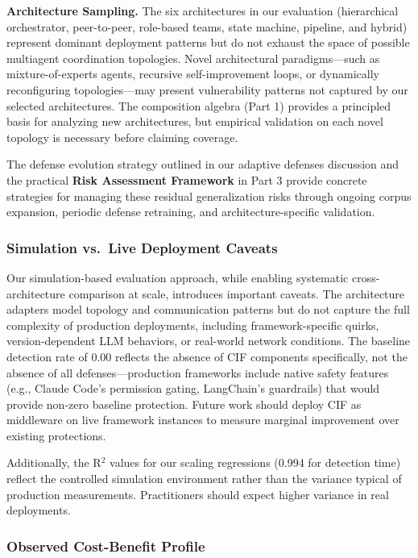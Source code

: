 \documentclass[
]{article}
\begin{document}
\textbf{Architecture Sampling.} The six architectures in our evaluation
(hierarchical orchestrator, peer-to-peer, role-based teams, state
machine, pipeline, and hybrid) represent dominant deployment patterns
but do not exhaust the space of possible multiagent coordination
topologies. Novel architectural paradigms---such as mixture-of-experts
agents, recursive self-improvement loops, or dynamically reconfiguring
topologies---may present vulnerability patterns not captured by our
selected architectures. The composition algebra (Part 1) provides a
principled basis for analyzing new architectures, but empirical
validation on each novel topology is necessary before claiming coverage.

The defense evolution strategy outlined in our adaptive defenses
discussion and the practical \textbf{Risk Assessment Framework} in Part
3 provide concrete strategies for managing these residual generalization
risks through ongoing corpus expansion, periodic defense retraining, and
architecture-specific validation.

\subsubsection{Simulation vs.~Live Deployment
Caveats}\label{simulation-vs.-live-deployment-caveats}

Our simulation-based evaluation approach, while enabling systematic
cross-architecture comparison at scale, introduces important caveats.
The architecture adapters model topology and communication patterns but
do not capture the full complexity of production deployments, including
framework-specific quirks, version-dependent LLM behaviors, or
real-world network conditions. The baseline detection rate of 0.00
reflects the absence of CIF components specifically, not the absence of
all defenses---production frameworks include native safety features
(e.g., Claude Code's permission gating, LangChain's guardrails) that
would provide non-zero baseline protection. Future work should deploy
CIF as middleware on live framework instances to measure marginal
improvement over existing protections.

Additionally, the R\(^2\) values for our scaling regressions (0.994 for
detection time) reflect the controlled simulation environment rather
than the variance typical of production measurements. Practitioners
should expect higher variance in real deployments.

\subsubsection{Observed Cost-Benefit
Profile}\label{observed-cost-benefit-profile}
\end{document}
